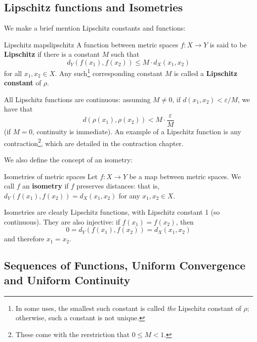 \subsection{Lipschitz functions and Isometries}

We make a brief mention Lipschitz constants and functions:
\begin{bdefin}{Lipschitz maps}{lipschitz} %
A function between metric spaces $f : X \to Y$ is said to be \textbf{Lipschitz} if there is a constant $M$ such that \[d_{Y}( f(x_{1}),  f(x_{2}) ) \leq M \cdot d_{X}(x_{1},x_{2})\] for all $x_{1}, x_{2} \in X$. Any such\footnote{In some uses, the smallest such constant is called \emph{the} Lipschitz constant of $\rho$; otherwise, such a constant is not unique.} corresponding constant $M$ is called a \textbf{Lipschitz constant} of $\rho$.
\end{bdefin}{}{}
All Lipschitz functions are continuous: assuming $M\neq 0$, if $d(x_{1},x_{2}) < {\varepsilon}/{M}$, we have that \[d(\rho(x_{1}), \rho(x_{2})) < M \cdot \frac{\varepsilon}{M}\] (if $M =0$, continuity is immediate). An example of a Lipschitz function is any contraction\footnote{These come with the rerstriction that $0\leq M < 1$.}, which are detailed in the contraction chapter.

We also define the concept of an isometry:
\begin{bdefin}{Isometries of metric spaces}{}
Let $f: X \to Y$ be a map between metric spaces. We call $f$ an \textbf{isometry} if $f$ preserves distances: that is, \mbox{$d_{Y}(f(x_{1}), f(x_{2})) = d_{X}(x_{1},x_{2})$} for any \mbox{$x_{1},x_{2}\in X$.}
\end{bdefin}

Isometries are clearly Lipschitz functions, with Lipschitz constant 1 (so continuous). They are also injective: if \mbox{$f(x_{1}) = f(x_{2})$}, then \[ 0 = d_{Y}(f(x_{1}), f(x_{2})) = d_{X}(x_{1},x_{2}) \] and therefore \mbox{$x_{1} = x_{2}$}. 

\subsection{Sequences of Functions, Uniform Convergence and Uniform Continuity}

